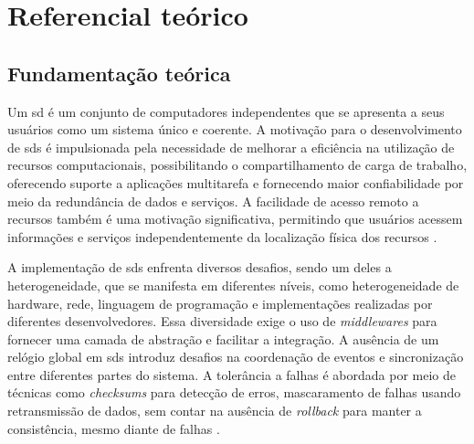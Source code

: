 \chapter{Referencial teórico}
\label{cap:referencialTeorico}

\section{Fundamentação teórica}
\label{section:background}

Um \gls{sd} é um conjunto de computadores independentes que se apresenta a seus usuários como um sistema único e coerente. A motivação para o desenvolvimento de \gls{sds} é impulsionada pela necessidade de melhorar a eficiência na utilização de recursos computacionais, possibilitando o compartilhamento de carga de trabalho, oferecendo suporte a aplicações multitarefa e fornecendo maior confiabilidade por meio da redundância de dados e serviços. A facilidade de acesso remoto a recursos também é uma motivação significativa, permitindo que usuários acessem informações e serviços independentemente da localização física dos recursos \cite{TanenbaumDistributedSystemsThirdEdition}.

A implementação de \gls{sds} enfrenta diversos desafios, sendo um deles a heterogeneidade, que se manifesta em diferentes níveis, como heterogeneidade de hardware, rede, linguagem de programação e implementações realizadas por diferentes desenvolvedores. Essa diversidade exige o uso de \textit{middlewares} para fornecer uma camada de abstração e facilitar a integração. A ausência de um relógio global em \gls{sds} introduz desafios na coordenação de eventos e sincronização entre diferentes partes do sistema. A tolerância a falhas é abordada por meio de técnicas como \textit{checksums} para detecção de erros, mascaramento de falhas usando retransmissão de dados, sem contar na ausência de \textit{rollback} para manter a consistência, mesmo diante de falhas \cite{DistributedSystemsCoulouris}.

